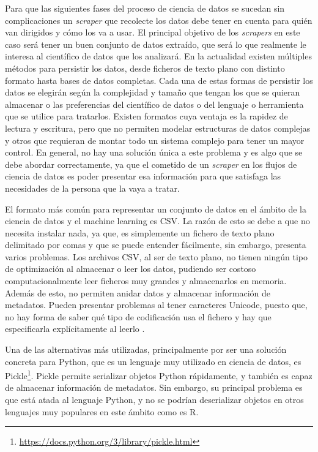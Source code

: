 Para que las siguientes fases del proceso de ciencia de datos se sucedan sin
complicaciones un \textit{scraper} que recolecte los datos debe tener en cuenta
para quién van dirigidos y cómo los va a usar. El principal objetivo de los
\textit{scrapers} en este caso será tener un buen conjunto de datos extraído,
que será lo que realmente le interesa al científico de datos que los analizará.
En la actualidad existen múltiples métodos para persistir los datos, desde
ficheros de texto plano con distinto formato hasta bases de datos completas.
Cada una de estas formas de persistir los datos se elegirán según la complejidad
y tamaño que tengan los que se quieran almacenar o las preferencias del
científico de datos o del lenguaje o herramienta que se utilice para tratarlos.
Existen formatos cuya ventaja es la rapidez de lectura y escritura, pero que no
permiten modelar estructuras de datos complejas y otros que requieran de montar
todo un sistema complejo para tener un mayor control. En general, no hay una
solución única a este problema y es algo que se debe abordar correctamente, ya
que el cometido de un \textit{scraper} en los flujos de ciencia de datos es
poder presentar esa información para que satisfaga las necesidades de la persona
que la vaya a tratar.

El formato más común para representar un conjunto de datos en el ámbito de la
ciencia de datos y el machine learning es CSV. La razón de esto se debe a que no
necesita instalar nada, ya que, es simplemente un fichero de texto plano
delimitado por comas y que se puede entender fácilmente, sin embargo, presenta
varios problemas. Los archivos CSV, al ser de texto plano, no tienen ningún tipo
de optimización al almacenar o leer los datos, pudiendo ser costoso
computacionalmente leer ficheros muy grandes y almacenarlos en memoria. Además
de esto, no permiten anidar datos y almacenar información de metadatos. Pueden
presentar problemas al tener caracteres Unicode, puesto que, no hay forma de
saber qué tipo de codificación usa el fichero y hay que especificarla
explícitamente al leerlo \cite{murallie_csvs_2022}.

Una de las alternativas más utilizadas, principalmente por ser una solución
concreta para Python, que es un lenguaje muy utilizado en ciencia de datos, es
Pickle\footnote{\url{https://docs.python.org/3/library/pickle.html}}\cite{murallie_csvs_2022}.
Pickle permite serializar objetos Python rápidamente, y también es capaz de
almacenar información de metadatos. Sin embargo, su principal problema es que
está atada al lenguaje Python, y no se podrían deserializar objetos en otros
lenguajes muy populares en este ámbito como es R. 

